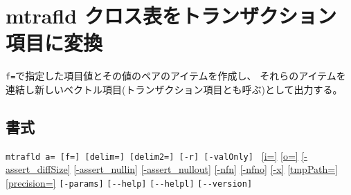 
%

\section{mtrafld クロス表をトランザクション項目に変換\label{sect:mtrafld}}
\verb|f=|で指定した項目値とその値のペアのアイテムを作成し、
それらのアイテムを連結し新しいベクトル項目(トランザクション項目とも呼ぶ)として出力する。

\subsection*{書式}
\verb|mtrafld a= [f=] [delim=] [delim2=] [-r] [-valOnly] |   
\hyperref[sect:option_i]{[i=]}
\hyperref[sect:option_o]{[o=]}
\hyperref[sect:option_assert_diffSize]{[-assert\_diffSize]}
\hyperref[sect:option_assert_nullin]{[-assert\_nullin]}
\hyperref[sect:option_assert_nullout]{[-assert\_nullout]}
\hyperref[sect:option_nfn]{[-nfn]} 
\hyperref[sect:option_nfno]{[-nfno]}  
\hyperref[sect:option_x]{[-x]}
\hyperref[sect:option_option_tmppath]{[tmpPath=]}
\hyperref[sect:option_precision]{[precision=]}
\verb|[-params]|
\verb|[--help]|
\verb|[--helpl]|
\verb|[--version]|\\

